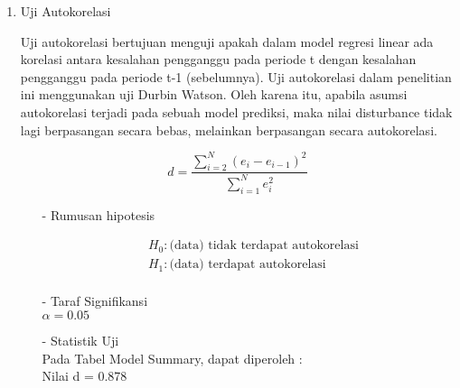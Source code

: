 \begin{enumerate}
\begin{enumerate}
    \item Uji Autokorelasi \\
    \begin{sloppypar}
    Uji autokorelasi bertujuan menguji apakah dalam model regresi linear ada korelasi antara kesalahan pengganggu pada periode t dengan kesalahan pengganggu pada periode t-1 (sebelumnya). Uji autokorelasi dalam penelitian ini menggunakan uji Durbin Watson. Oleh karena itu, apabila asumsi autokorelasi terjadi pada sebuah model prediksi, maka nilai disturbance tidak lagi berpasangan secara bebas, melainkan berpasangan secara autokorelasi.
    \end{sloppypar}
    \begin{equation*}
        d = \frac{\sum_{i=2}^N (e_i - e_{i-1})^2}{\sum_{i=1}^N e_i^2}
    \end{equation*}
    \begin{test}{
        \begin{enumerate}
        \item[-] Rumusan hipotesis \\
        \begin{fleqn}[\parindent]
            \begin{equation*}
            \begin{split}
            &H_0 : \text{(data) tidak terdapat autokorelasi} \\ 
            &H_1 : \text{(data) terdapat autokorelasi} \\
            \end{split}
            \end{equation*}
        \end{fleqn}
    
        \item[-] Taraf Signifikansi \\
        $\alpha = 0.05$
    
        \item[-] Statistik Uji \\
        Pada Tabel Model Summary, dapat diperoleh : \\
        Nilai d = 0.878
    

\end{enumerate}}
\end{test}
\end{enumerate}
\end{enumerate}
